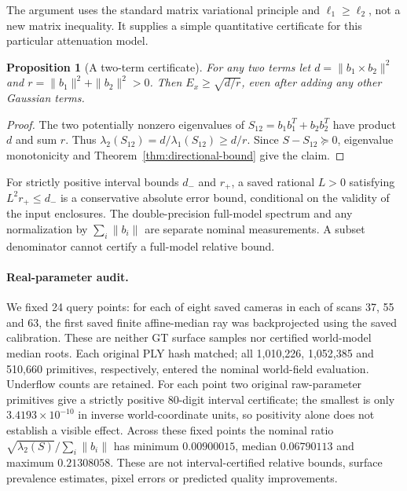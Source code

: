 \documentclass[11pt,a4paper]{article}
\newtheorem{proposition}[theorem]{Proposition}
\begin{document}
The argument uses the standard matrix variational principle and
$\ell_1\ge\ell_2$, not a new matrix inequality. It supplies a simple
quantitative certificate for this particular attenuation model.

\begin{proposition}[A two-term certificate]\label{prop:directional-pair}
For any two terms let $d=\|b_1\times b_2\|^2$ and
$r=\|b_1\|^2+\|b_2\|^2>0$. Then $E_x\ge\sqrt{d/r}$,
even after adding any other Gaussian terms.
\end{proposition}
\begin{proof}
The two potentially nonzero eigenvalues of
$S_{12}=b_1b_1^T+b_2b_2^T$ have product $d$ and sum $r$.
Thus $\lambda_2(S_{12})=d/\lambda_1(S_{12})\ge d/r$.
Since $S-S_{12}\succeq0$, eigenvalue monotonicity and
Theorem~\ref{thm:directional-bound} give the claim.
\end{proof}

For strictly positive interval bounds $d_-$ and $r_+$, a saved
rational $L>0$ satisfying $L^2r_+\le d_-$ is a conservative
absolute error bound, conditional on the validity of the input
enclosures. The double-precision full-model spectrum and any
normalization by $\sum_i\|b_i\|$ are separate nominal measurements.
A subset denominator cannot certify a full-model relative bound.

\paragraph{Real-parameter audit.}
We fixed 24 query points: for each of eight saved cameras in each of
scans 37, 55 and 63, the first saved finite affine-median ray was
backprojected using the saved calibration. These are neither GT
surface samples nor certified world-model median roots. Each original
PLY hash matched; all 1,010,226, 1,052,385 and 510,660 primitives,
respectively, entered the nominal world-field evaluation. Underflow
counts are retained. For each point two original raw-parameter
primitives give a strictly positive 80-digit interval certificate;
the smallest is only $3.4193\times10^{-10}$ in inverse world-coordinate
units, so positivity alone does not establish a visible effect.
Across these fixed points the nominal ratio
$\sqrt{\lambda_2(S)}/\sum_i\|b_i\|$ has minimum $0.00900015$,
median $0.06790113$ and maximum $0.21308058$. These are not
interval-certified relative bounds, surface prevalence estimates,
pixel errors or predicted quality improvements.
\end{document}
